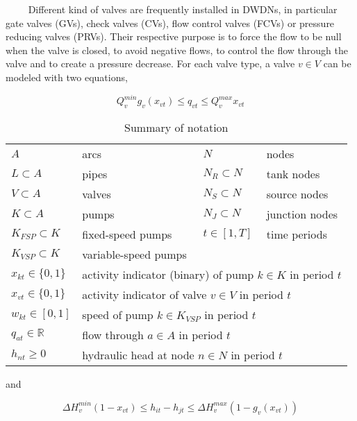 \documentclass{article}
\begin{document}
~~~~ Different kind of valves are frequently installed in DWDNs, in particular
gate valves (GVs), check valves (CVs),
flow control valves (FCVs) or pressure
reducing valves (PRVs). Their respective purpose is to force the
flow to be
null when the valve is closed, to avoid negative
flows, to control the
flow
through the valve and to create a pressure decrease. For each valve type, a
valve $v \in V$ can be modeled with two equations,

\begin{equation}
Q_v^{min}g_v(x_{vt}) \leq q_{vt} \leq Q_v^{max}x_{vt}
\end{equation}

\begin{table}
  \centering
  \begin{tabular}{llll}
    \hline
  $A$ & arcs & $N$ & nodes\\
  $L\subset A$ & pipes & $N_R\subset N$ & tank nodes \\
  $V\subset A$ & valves & $N_S\subset N$ & source nodes\\
  $K\subset A$ &pumps& $N_J\subset N$ & junction nodes\\
  $K_{FSP}\subset K$ & fixed-speed pumps& $t\in[1,T]$ &time periods \\
  $K_{VSP}\subset K$ & variable-speed pumps & & \\[.5em]
  $x_{kt}\in\{0,1\}$ & \multicolumn{3}{l}{ activity indicator (binary) of pump $k \in K$ in period $t$}\\
  $x_{vt}\in\{0,1\}$ & \multicolumn{3}{l}{activity indicator of valve $v\in V$ in period $t$}\\
  $w_{kt}\in[0,1]$ & \multicolumn{3}{l}{speed of pump $k\in K_{VSP}$ in period $t$}\\
  $q_{at}\in \mathbb{R}$ & \multicolumn{3}{l}{flow through $a\in A$ in period $t$}\\
  $h_{nt}\ge 0$ & \multicolumn{3}{l}{hydraulic head at node $n\in N$ in period $t$}\\
    \hline
\end{tabular}
\caption{Summary of notation}
\label{tab:not}
\end{table}

\newpage

and

\begin{equation}
\Delta H_v^{min}(1-x_{vt}) \leq  h_{it}-h_{jt} \leq \Delta H_v^{max}(1-g_v(x_{vt}))
\end{equation}
\end{document}
